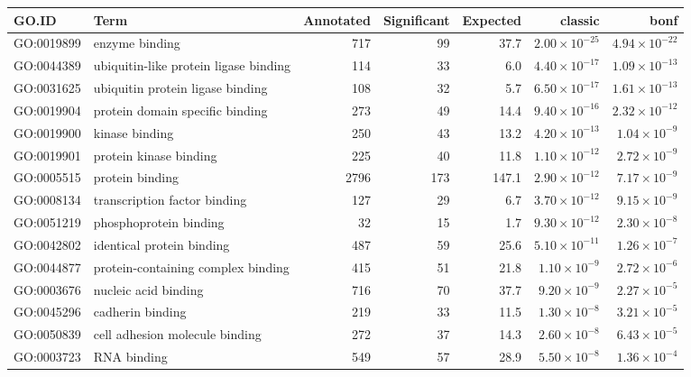 \begin{table}[ht]
\centering
\begin{adjustbox}{max width=\textwidth}
\begin{tabular}{llrrrrr}
  \hline
GO.ID & Term & Annotated & Significant & Expected & classic & bonf \\ 
  \hline
GO:0019899 & enzyme binding & 717 & 99 & 37.7 & $2.00 \times 10^{-25}$ & $4.94 \times 10^{-22}$ \\ 
  GO:0044389 & ubiquitin-like protein ligase binding & 114 & 33 & 6.0 & $4.40 \times 10^{-17}$ & $1.09 \times 10^{-13}$ \\ 
  GO:0031625 & ubiquitin protein ligase binding & 108 & 32 & 5.7 & $6.50 \times 10^{-17}$ & $1.61 \times 10^{-13}$ \\ 
  GO:0019904 & protein domain specific binding & 273 & 49 & 14.4 & $9.40 \times 10^{-16}$ & $2.32 \times 10^{-12}$ \\ 
  GO:0019900 & kinase binding & 250 & 43 & 13.2 & $4.20 \times 10^{-13}$ & $1.04 \times 10^{-9}$ \\ 
  GO:0019901 & protein kinase binding & 225 & 40 & 11.8 & $1.10 \times 10^{-12}$ & $2.72 \times 10^{-9}$ \\ 
  GO:0005515 & protein binding & 2796 & 173 & 147.1 & $2.90 \times 10^{-12}$ & $7.17 \times 10^{-9}$ \\ 
  GO:0008134 & transcription factor binding & 127 & 29 & 6.7 & $3.70 \times 10^{-12}$ & $9.15 \times 10^{-9}$ \\ 
  GO:0051219 & phosphoprotein binding & 32 & 15 & 1.7 & $9.30 \times 10^{-12}$ & $2.30 \times 10^{-8}$ \\ 
  GO:0042802 & identical protein binding & 487 & 59 & 25.6 & $5.10 \times 10^{-11}$ & $1.26 \times 10^{-7}$ \\ 
  GO:0044877 & protein-containing complex binding & 415 & 51 & 21.8 & $1.10 \times 10^{-9}$ & $2.72 \times 10^{-6}$ \\ 
  GO:0003676 & nucleic acid binding & 716 & 70 & 37.7 & $9.20 \times 10^{-9}$ & $2.27 \times 10^{-5}$ \\ 
  GO:0045296 & cadherin binding & 219 & 33 & 11.5 & $1.30 \times 10^{-8}$ & $3.21 \times 10^{-5}$ \\ 
  GO:0050839 & cell adhesion molecule binding & 272 & 37 & 14.3 & $2.60 \times 10^{-8}$ & $6.43 \times 10^{-5}$ \\ 
  GO:0003723 & RNA binding & 549 & 57 & 28.9 & $5.50 \times 10^{-8}$ & $1.36 \times 10^{-4}$ \\ 

\end{tabular}
\end{adjustbox}
\end{table}
